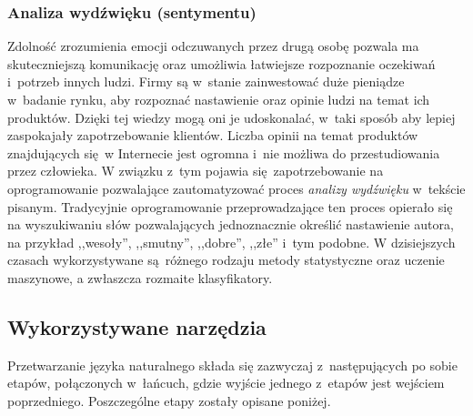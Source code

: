 \documentclass[a4paper, twoside, 12pt]{report}
\begin{document}
            \subsubsection{Analiza wydźwięku (sentymentu)}
                Zdolność zrozumienia emocji odczuwanych przez drugą osobę pozwala ma skuteczniejszą komunikację oraz
                umożliwia łatwiejsze rozpoznanie oczekiwań i~potrzeb innych ludzi. Firmy są w~stanie zainwestować duże
                pieniądze w~badanie rynku, aby rozpoznać nastawienie oraz opinie ludzi na temat ich produktów. Dzięki
                tej wiedzy mogą oni je udoskonalać, w~taki sposób aby lepiej zaspokajały zapotrzebowanie klientów.
                Liczba opinii na temat produktów znajdujących się w Internecie jest ogromna i~nie możliwa do
                przestudiowania przez człowieka. W związku z~tym pojawia się zapotrzebowanie na oprogramowanie pozwalające
                zautomatyzować proces \emph{analizy wydźwięku} w~tekście pisanym. Tradycyjnie oprogramowanie
                przeprowadzające ten proces opierało się na wyszukiwaniu słów pozwalających jednoznacznie określić
                nastawienie autora, na przykład ,,wesoły'', ,,smutny'', ,,dobre'', ,,złe'' i~tym podobne. W dzisiejszych
                czasach wykorzystywane są różnego rodzaju metody statystyczne oraz uczenie maszynowe, a zwłaszcza rozmaite
                klasyfikatory\cite{SENTIMENTANALYSIS}.

        \subsection{Wykorzystywane narzędzia}
            Przetwarzanie języka naturalnego składa się zazwyczaj z~następujących po sobie etapów, połączonych w~łańcuch,
            gdzie wyjście jednego z~etapów jest wejściem poprzedniego. Poszczególne etapy zostały opisane poniżej.
\end{document}
